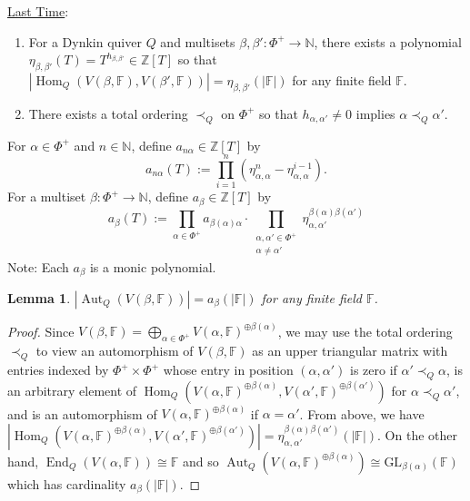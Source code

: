 \documentclass{book}
\newtheorem{lemma}[theorem]{Lemma}
\DeclareMathOperator{\Hom}{Hom}
\DeclareMathOperator{\End}{End}
\DeclareMathOperator{\Aut}{Aut}
\begin{document}
     
    
    \vspace{1cm} \underline{Last Time}: 
    \begin{enumerate}
        \item For a Dynkin quiver $Q$ and multisets $\beta,\beta':\Phi^+\to\mathbb{N}$, there exists a polynomial $\eta_{\beta,\beta'}(T)=T^{h_{\beta,\beta'}}\in\mathbb{Z}[T]$ so that $|\Hom_Q(V(\beta,\mathbb{F}),V(\beta',\mathbb{F}))|=\eta_{\beta,\beta'}(|\mathbb{F}|)$ for any finite field $\mathbb{F}$. 
        \item There exists a total ordering $\prec_Q$ on $\Phi^+$ so that $h_{\alpha,\alpha'}\neq 0$ implies $\alpha\prec_Q\alpha'$.
    \end{enumerate}
    
    For $\alpha\in\Phi^+$ and $n\in\mathbb{N}$, define $a_{n\alpha}\in\mathbb{Z}[T]$ by \[a_{n\alpha}(T):= \prod_{i=1}^n (\eta_{\alpha,\alpha}^n-\eta_{\alpha,\alpha}^{i-1}).\]
    For a multiset  $\beta:\Phi^+\to\mathbb{N}$, define $a_\beta\in\mathbb{Z}[T]$ by \[a_{\beta}(T):= \prod_{\alpha\in\Phi^+}a_{\beta(\alpha)\alpha}\cdot\prod_{\substack{\alpha,\alpha'\in\Phi^+ \\ \alpha\neq\alpha'}}\eta_{\alpha,\alpha'}^{\beta(\alpha)\beta(\alpha')}\]
    Note: Each $a_\beta$ is a monic polynomial. 
    
    \begin{lemma}
        $|\Aut_Q(V(\beta,\mathbb{F}))|=a_\beta(|\mathbb{F}|)$ for any finite field $\mathbb{F}$.
    \end{lemma}
    
    \begin{proof}
        Since $V(\beta,\mathbb{F})=\bigoplus_{\alpha\in\Phi^+}V(\alpha,\mathbb{F})^{\oplus\beta(\alpha)}$, we may use the total ordering $\prec_Q$ to view an automorphism of $V(\beta,\mathbb{F})$ as an upper triangular matrix with entries indexed by $\Phi^+\times\Phi^+$ whose entry in position $(\alpha,\alpha')$ is zero if $\alpha'\prec_Q\alpha$, is an arbitrary element of $\Hom_Q(V(\alpha,\mathbb{F})^{\oplus\beta(\alpha)},V(\alpha',\mathbb{F})^{\oplus\beta(\alpha')})$ for $\alpha\prec_Q\alpha'$, and is an automorphism of $V(\alpha,\mathbb{F})^{\oplus\beta(\alpha)}$ if $\alpha=\alpha'$. From above, we have $|\Hom_Q(V(\alpha,\mathbb{F})^{\oplus\beta(\alpha)},V(\alpha',\mathbb{F})^{\oplus\beta(\alpha')})|=\eta_{\alpha,\alpha'}^{\beta(\alpha)\beta(\alpha')}(|\mathbb{F}|).$ On the other hand, $\End_Q(V(\alpha,\mathbb{F}))\cong\mathbb{F}$ and so $\Aut_Q(V(\alpha,\mathbb{F})^{\oplus\beta(\alpha)})\cong\text{GL}_{\beta(\alpha)}(\mathbb{F})$ which has cardinality $a_\beta(|\mathbb{F}|)$.
    \end{proof}
\end{document}
